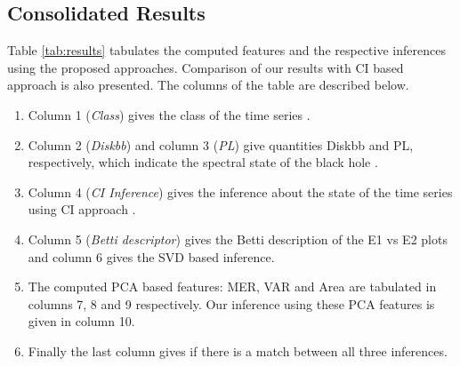 \documentclass[10pt,conference]{IEEEtran}
\begin{document}
\subsection{Consolidated Results}

Table \ref{tab:results}  tabulates the computed features and the respective inferences using the proposed approaches. Comparison of our results with CI based approach \cite{Adegoke2018} is also presented. The columns of the table are described below.

\begin{enumerate}
\item Column 1 (\textit{Class}) gives the class of the time series \cite{Adegoke2018}.
\item Column 2 (\textit{Diskbb}) and column 3 (\textit{PL}) give quantities Diskbb and  PL, respectively, which indicate the spectral state of the black hole \cite{Adegoke2018}.
\item Column 4 (\textit{CI Inference}) gives the inference about the state of the time series using CI approach \cite{Adegoke2018}.
\item Column 5 (\textit{Betti descriptor}) gives the Betti description of the E1 vs E2 plots and column 6 gives the SVD based inference.
\item The computed PCA based features: MER, VAR and Area  are tabulated in columns 7, 8 and 9 respectively. Our inference using these PCA features is given in column 10.
\item Finally the last column gives if there is a match between all three inferences.
\end{enumerate}
\end{document}
